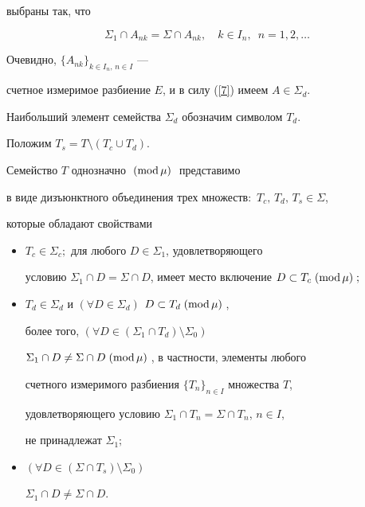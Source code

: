 \begin{pf}
выбраны так, что


\begin{equation}


\label{7}


\Sigma_1\cap A_{nk}=\Sigma\cap A_{nk}, \quad k\in I_n,\;\ n=1,2,


\dotsc


\end{equation}


Очевидно, $\{A_{nk}\}_{k\in I_n,\,n\in I}$ ---


счетное измеримое разбиение $E$, и в силу (\ref{7}) имеем $A\in\Sigma_d$.


\end{pf}





Наибольший элемент семейства $\Sigma_d$ обозначим символом $T_d$.


Положим $T_s=T\setminus(T_c\cup T_d)$.





\begin{thm}


Семейство $T$ однозначно $\;(\mathrm{mod}\,\mu)\;$ представимо


в виде дизъюнктного объединения трех множеств$:$ $T_c,\,T_d,\,T_s\in\Sigma$,


которые обладают свойствами


\begin{itemize}


\item[1)] $T_c\in\Sigma_c;$ для любого $D\in\Sigma_1$, удовлетворяющего


условию $\Sigma_1\cap D=\Sigma\cap D$, имеет место включение $D\subset


T_c\moddd;$


\item[2)] $T_d\in\Sigma_d$ и $(\forall D\in\Sigma_d)$\; $D\subset T_d\;(\mathrm{mod}\,\mu)\;$,


более того, $(\forall D\in(\Sigma_1\cap T_d)\setminus\Sigma_0)$\;


$\Sigma_1\cap D\ne\Sigma\cap D\;(\mathrm{mod}\,\mu)\;$, в частности, элементы любого


счетного измеримого разбиения $\{T_n\}_{n\in I}$ множества $T$,


удовлетворяющего условию $\Sigma_1\cap T_n=\Sigma\cap T_n$, $n\in I$,


не принадлежат $\Sigma_1;$


\item[3)] $(\forall D\in(\Sigma\cap T_s)\setminus\Sigma_0)$\;


$\Sigma_1\cap D\ne\Sigma\cap D$.


\end{itemize}


\end{thm}





